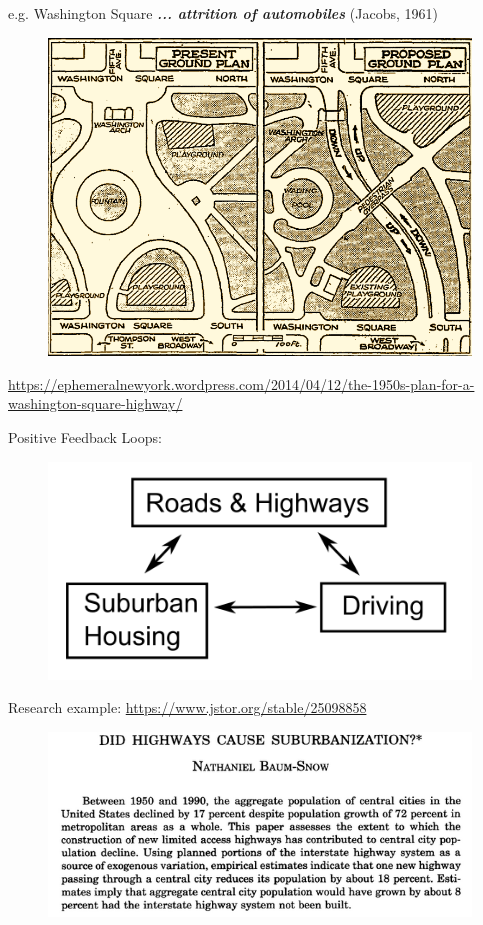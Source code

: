 \documentclass[aspectratio=169]{beamer}
\begin{document}
\begin{frame}
	
	e.g. Washington Square \textbf{\textit{... attrition of automobiles}} (Jacobs, 1961)
	
	\begin{figure}
		\centering
		\includegraphics[width=0.65\linewidth]{images/washsquare1950splan.png}
	\end{figure}
	
	
	\tiny\url{https://ephemeralnewyork.wordpress.com/2014/04/12/the-1950s-plan-for-a-washington-square-highway/}
	
\end{frame}






\begin{frame}
	
	Positive Feedback Loops:
	
	\begin{figure}
		\centering
		\includegraphics[width=0.4\linewidth]{images/feedback_suburb_driving.png}
	\end{figure}

	Research example: \small\url{https://www.jstor.org/stable/25098858}

	\begin{figure}
		\centering
		\includegraphics[width=0.7\linewidth]{images/baumsnow_highways.png}
	\end{figure}
		
\end{frame}
\end{document}
